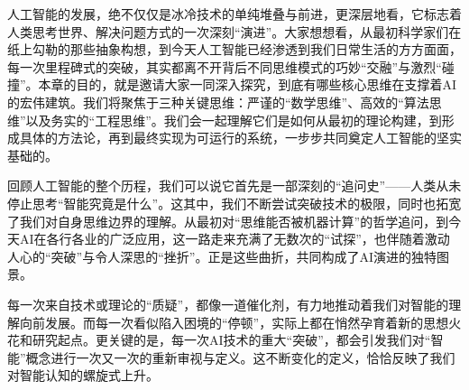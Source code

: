 


人工智能的发展，绝不仅仅是冰冷技术的单纯堆叠与前进，更深层地看，它标志着人类思考世界、解决问题方式的一次深刻“演进”。大家想想看，从最初科学家们在纸上勾勒的那些抽象构想，到今天人工智能已经渗透到我们日常生活的方方面面，每一次里程碑式的突破，其实都离不开背后不同思维模式的巧妙“交融”与激烈“碰撞”。本章的目的，就是邀请大家一同深入探究，到底有哪些核心思维在支撑着AI的宏伟建筑。我们将聚焦于三种关键思维：严谨的“数学思维”、高效的“算法思维”以及务实的“工程思维”。我们会一起理解它们是如何从最初的理论构建，到形成具体的方法论，再到最终实现为可运行的系统，一步步共同奠定人工智能的坚实基础的。



回顾人工智能的整个历程，我们可以说它首先是一部深刻的“追问史”——人类从未停止思考“智能究竟是什么”。这其中，我们不断尝试突破技术的极限，同时也拓宽了我们对自身思维边界的理解。从最初对“思维能否被机器计算”的哲学追问，到今天AI在各行各业的广泛应用，这一路走来充满了无数次的“试探”，也伴随着激动人心的“突破”与令人深思的“挫折”。正是这些曲折，共同构成了AI演进的独特图景。

每一次来自技术或理论的“质疑”，都像一道催化剂，有力地推动着我们对智能的理解向前发展。而每一次看似陷入困境的“停顿”，实际上都在悄然孕育着新的思想火花和研究起点。更关键的是，每一次AI技术的重大“突破”，都会引发我们对“智能”概念进行一次又一次的重新审视与定义。这不断变化的定义，恰恰反映了我们对智能认知的螺旋式上升。

